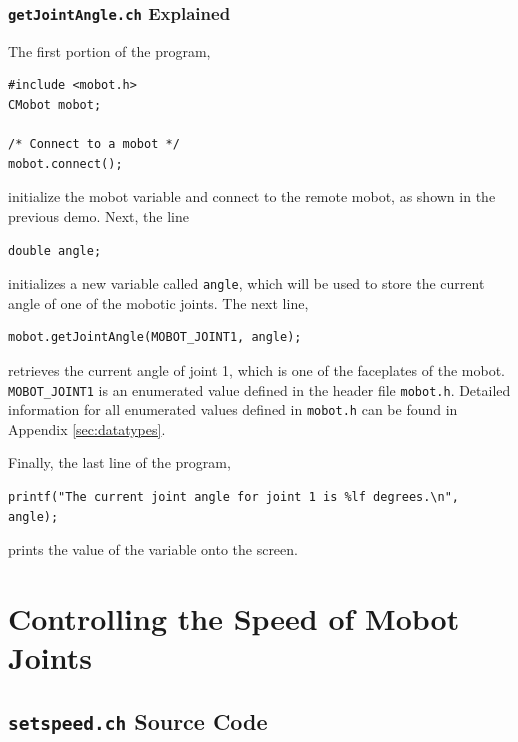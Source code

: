 \documentclass{article}
\begin{document}
\subsubsection{\texttt{getJointAngle.ch} Explained}
The first portion of the program, 
\begin{verbatim}
#include <mobot.h>
CMobot mobot;

/* Connect to a mobot */
mobot.connect();
\end{verbatim}
initialize the mobot variable and connect to the remote mobot, as shown in the
previous demo. Next, the line
\begin{verbatim}
double angle;
\end{verbatim}
initializes a new variable called \texttt{angle}, which will be used to store
the current angle of one of the mobotic joints. The next line,
\begin{verbatim}
mobot.getJointAngle(MOBOT_JOINT1, angle);
\end{verbatim}
retrieves the current angle of joint 1, which is one of the faceplates of the
mobot. 
\texttt{MOBOT\_JOINT1} is an enumerated value
defined in the header file \texttt{mobot.h}. Detailed information
for all enumerated values defined in \texttt{mobot.h} can be found in 
Appendix \ref{sec:datatypes}.

Finally, the last line of the program,
\begin{verbatim}
printf("The current joint angle for joint 1 is %lf degrees.\n", angle);
\end{verbatim}
prints the value of the variable onto the screen. 


\section{Controlling the Speed of Mobot Joints}
\subsection{\texttt{setspeed.ch} Source Code}

\end{document}

